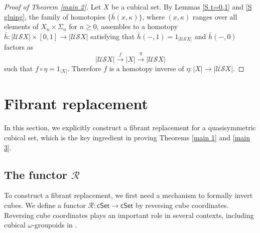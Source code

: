 \documentclass[oneside, 12pt]{amsart}
\numberwithin{equation}{section}
\theoremstyle{plain}
\newtheorem{proposition}[theorem]{Proposition}
\theoremstyle{definition}
\theoremstyle{remark}
\newcommand{\cSet}{\mathsf{cSet}}
\begin{document}
	
	
	\begin{proof}
		[Proof of Theorem \ref{main 2}]
		Let $X$ be a cubical set. By Lemmas \ref{S t=0,1} and \ref{S gluing}, the family of homotopies $\{\bar{h}(x,\kappa)\}$, where $(x,\kappa)$ ranges over all elements of $X_n\times\Sigma_n$ for $n\ge 0$, assembles to a homotopy $\bar{h}\colon|\mathcal{US}X|\times[0,1]\to|\mathcal{US}X|$ satisfying that $\bar{h}(-,1)=1_{|\mathcal{US}X|}$ and $\bar{h}(-,0)$ factors as
		\[
		|\mathcal{US}X|\xrightarrow{f}|X|\xrightarrow{\eta}|\mathcal{US}X|
		\]
		such that $f\circ\eta=1_{|X|}$. Therefore $f$ is a homotopy inverse of $\eta\colon|X|\to|\mathcal{US}X|$.
	\end{proof}
	
	
	
	\section{Fibrant replacement}\label{Fibrant replacement}
	
	In this section, we explicitly construct a fibrant replacement for a quasisymmetric cubical set, which is the key ingredient in proving Theorems \ref{main 1} and \ref{main 3}.
	
	
	
	\subsection{The functor $\mathcal{R}$}
	
	To construct a fibrant replacement, we first need a mechanism to formally invert cubes. We define a functor $\mathcal{R}\colon\cSet\to\cSet$ by reversing cube coordinates. Reversing cube coordinates plays an important role in several contexts, including cubical $\omega$-groupoids in \cite{BHS}.
	
	
	
\end{document}
